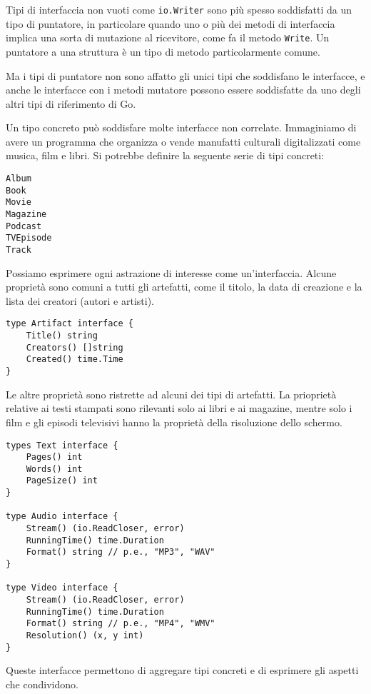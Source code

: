 \documentclass[../../thesis.tex]{subfiles}
\begin{document}
    Tipi di interfaccia non vuoti come \verb"io.Writer" sono più spesso soddisfatti da un tipo di puntatore, in particolare quando uno o più dei metodi di interfaccia implica una sorta di mutazione al ricevitore, come fa il metodo \verb"Write".
    Un puntatore a una struttura è un tipo di metodo particolarmente comune.
    \hfill \vspace{12pt}

    Ma i tipi di puntatore non sono affatto gli unici tipi che soddisfano le interfacce, e anche le interfacce con i metodi mutatore possono essere soddisfatte da uno degli altri tipi di riferimento di Go.
    \hfill \vspace{12pt}

    Un tipo concreto può soddisfare molte interfacce non correlate.
    Immaginiamo di avere un programma che organizza o vende manufatti culturali digitalizzati come musica, film e libri.
    Si potrebbe definire la seguente serie di tipi concreti:
    \begin{lstlisting}[frame = single, label = {lst:lstlisting6-3.4}]
Album
Book
Movie
Magazine
Podcast
TVEpisode
Track
    \end{lstlisting}
    Possiamo esprimere ogni astrazione di interesse come un'interfaccia.
    Alcune proprietà sono comuni a tutti gli artefatti, come il titolo, la data di creazione e la lista dei creatori (autori e artisti).
    \begin{lstlisting}[frame = single, label = {lst:lstlisting6-3.5}]
type Artifact interface {
    Title() string
    Creators() []string
    Created() time.Time
}
    \end{lstlisting}
    Le altre proprietà sono ristrette ad alcuni dei tipi di artefatti.
    La prioprietà relative ai testi stampati sono rilevanti solo ai libri e ai magazine, mentre solo i film e gli episodi televisivi hanno la proprietà della risoluzione dello schermo.
    \begin{lstlisting}[frame = single, label = {lst:lstlisting6-3.6}]
types Text interface {
    Pages() int
    Words() int
    PageSize() int
}

type Audio interface {
    Stream() (io.ReadCloser, error)
    RunningTime() time.Duration
    Format() string // p.e., "MP3", "WAV"
}

type Video interface {
    Stream() (io.ReadCloser, error)
    RunningTime() time.Duration
    Format() string // p.e., "MP4", "WMV"
    Resolution() (x, y int)
}
    \end{lstlisting}
    Queste interfacce permettono di aggregare tipi concreti e di esprimere gli aspetti che condividono.
\end{document}
